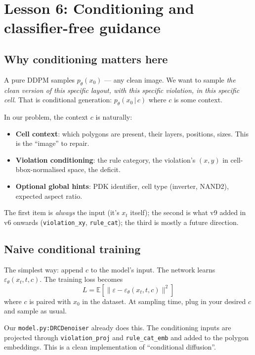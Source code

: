 \documentclass[11pt,a4paper]{article}
\newcommand{\E}{\mathbb{E}}
\newcommand{\given}{\,|\,}
\newcommand{\eps}{\varepsilon}
\begin{document}
\section{Lesson 6: Conditioning and classifier-free guidance}

\subsection{Why conditioning matters here}

A pure DDPM samples $p_\theta(x_0)$ --- any clean image. We want to
sample \emph{the clean version of this specific layout, with this
specific violation, in this specific cell}. That is conditional
generation: $p_\theta(x_0 \given c)$ where $c$ is some context.

In our problem, the context $c$ is naturally:
\begin{itemize}[leftmargin=*]
\item \textbf{Cell context}: which polygons are present, their layers,
  positions, sizes. This is the ``image'' to repair.
\item \textbf{Violation conditioning}: the rule category, the
  violation's $(x, y)$ in cell-bbox-normalised space, the deficit.
\item \textbf{Optional global hints}: PDK identifier, cell type
  (inverter, NAND2), expected aspect ratio.
\end{itemize}

The first item is \emph{always} the input (it's $x_t$ itself); the
second is what v9 added in v6 onwards (\verb|violation_xy|, \verb|rule_cat|);
the third is mostly a future direction.

\subsection{Naive conditional training}

The simplest way: append $c$ to the model's input. The network learns
$\eps_\theta(x_t, t, c)$. The training loss becomes
\[
L = \E\!\left[\|\eps - \eps_\theta(x_t, t, c)\|^2\right]
\]
where $c$ is paired with $x_0$ in the dataset. At sampling time, plug
in your desired $c$ and sample as usual.

Our \texttt{model.py:DRCDenoiser} already does this. The conditioning
inputs are projected through \verb|violation_proj| and \verb|rule_cat_emb|
and added to the polygon embeddings. This is a clean implementation of
``conditional diffusion''.
\end{document}
